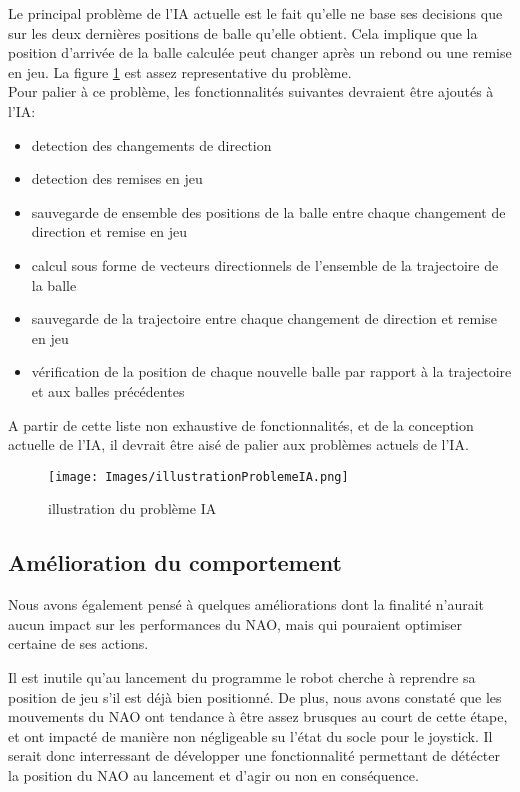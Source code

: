     \par Le principal problème de l'IA actuelle est le fait qu'elle ne base ses decisions que sur les deux dernières positions de balle qu'elle obtient.
    Cela implique que la position d'arrivée de la balle calculée peut changer après un rebond ou une remise en jeu.
    La figure \ref{fig:illustration du problème IA} est assez representative du problème. \\
    Pour palier à ce problème, les fonctionnalités suivantes devraient être ajoutés à l'IA:
    \begin{itemize}
      \item detection des changements de direction
      \item detection des remises en jeu
      \item sauvegarde de ensemble des positions de la balle entre chaque changement de direction et remise en jeu
      \item calcul sous forme de vecteurs directionnels de l'ensemble de la trajectoire de la balle
      \item sauvegarde de la trajectoire entre chaque changement de direction et remise en jeu
      \item vérification de la position de chaque nouvelle balle par rapport à la trajectoire et aux balles précédentes
    \end{itemize}
    A partir de cette liste non exhaustive de fonctionnalités, et de la conception actuelle de l'IA, il devrait être aisé de palier aux problèmes actuels de l'IA.

    \begin{figure}[!h]
      \caption{illustration du problème IA}
      \label{fig:illustration du problème IA}
      \centering
      \texttt{[image: Images/illustrationProblemeIA.png]}
    \end{figure}

  \subsection{Amélioration du comportement}
  \label{sub:Amélioration du comportement}
    \par Nous avons également pensé à quelques améliorations dont la finalité n'aurait aucun impact sur les performances du NAO, mais qui pouraient optimiser certaine de ses actions.\\

    \par Il est inutile qu'au lancement du programme le robot cherche à reprendre sa position de jeu s'il est déjà bien positionné.
    De plus, nous avons constaté que les mouvements du NAO ont tendance à être assez brusques au court de cette étape, et ont impacté de manière non négligeable su l'état du socle pour le joystick.
    Il serait donc interressant de développer une fonctionnalité permettant de détécter la position du NAO au lancement et d'agir ou non en conséquence.\\


